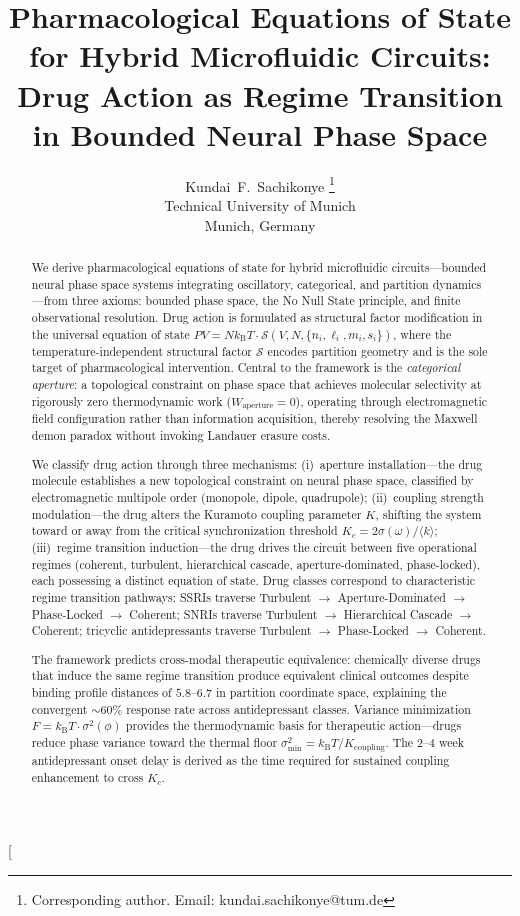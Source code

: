 \documentclass[twocolumn,10pt]{article}
\title{%
  \textbf{Pharmacological Equations of State for Hybrid Microfluidic Circuits: Drug Action as Regime Transition in Bounded Neural Phase Space}
}
\author{
  Kundai~F.~Sachikonye%
  \thanks{Corresponding author. Email: kundai.sachikonye@tum.de}
  \\[4pt]
  \small Technical University of Munich \\
  \small Munich, Germany
}
\date{}
\theoremstyle{remark}
\newcommand{\kB}{k_{\mathrm{B}}}
\begin{document}
\twocolumn[
  \maketitle
  \begin{@twocolumnfalse}
  \begin{abstract}
\noindent
We derive pharmacological equations of state for hybrid microfluidic circuits---bounded neural phase space systems integrating oscillatory, categorical, and partition dynamics---from three axioms: bounded phase space, the No Null State principle, and finite observational resolution. Drug action is formulated as structural factor modification in the universal equation of state $PV = N\kB T \cdot \mathcal{S}(V, N, \{n_i, \ell_i, m_i, s_i\})$, where the temperature-independent structural factor $\mathcal{S}$ encodes partition geometry and is the sole target of pharmacological intervention. Central to the framework is the \emph{categorical aperture}: a topological constraint on phase space that achieves molecular selectivity at rigorously zero thermodynamic work ($W_{\mathrm{aperture}} = 0$), operating through electromagnetic field configuration rather than information acquisition, thereby resolving the Maxwell demon paradox without invoking Landauer erasure costs.

We classify drug action through three mechanisms: (i)~aperture installation---the drug molecule establishes a new topological constraint on neural phase space, classified by electromagnetic multipole order (monopole, dipole, quadrupole); (ii)~coupling strength modulation---the drug alters the Kuramoto coupling parameter $K$, shifting the system toward or away from the critical synchronization threshold $K_c = 2\sigma(\omega)/\langle k \rangle$; (iii)~regime transition induction---the drug drives the circuit between five operational regimes (coherent, turbulent, hierarchical cascade, aperture-dominated, phase-locked), each possessing a distinct equation of state. Drug classes correspond to characteristic regime transition pathways: SSRIs traverse Turbulent $\to$ Aperture-Dominated $\to$ Phase-Locked $\to$ Coherent; SNRIs traverse Turbulent $\to$ Hierarchical Cascade $\to$ Coherent; tricyclic antidepressants traverse Turbulent $\to$ Phase-Locked $\to$ Coherent.

The framework predicts cross-modal therapeutic equivalence: chemically diverse drugs that induce the same regime transition produce equivalent clinical outcomes despite binding profile distances of $5.8$--$6.7$ in partition coordinate space, explaining the convergent $\sim\!60\%$ response rate across antidepressant classes. Variance minimization $F = \kB T \cdot \sigma^2(\phi)$ provides the thermodynamic basis for therapeutic action---drugs reduce phase variance toward the thermal floor $\sigma^2_{\min} = \kB T / K_{\mathrm{coupling}}$. The 2--4 week antidepressant onset delay is derived as the time required for sustained coupling enhancement to cross $K_c$.


\end{abstract}
\end{@twocolumnfalse}
\end{document}
